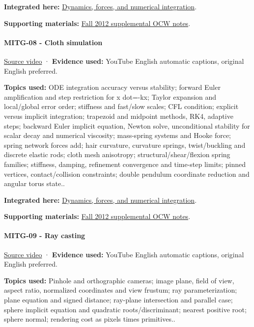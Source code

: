 \textbf{Integrated here:} \hyperref[04-visual-computing-ii-ch029]{Dynamics, forces, and numerical integration}.

\textbf{Supporting materials:} \href{https://ocw.mit.edu/courses/6-837-computer-graphics-fall-2012/pages/lecture-notes/}{Fall 2012 supplemental OCW notes}.

\paragraph{MITG-08 - Cloth simulation}\label{mitg-08---cloth-simulation}

\href{https://www.youtube.com/watch?v=PJ8VzufNZ8o}{Source video} · \textbf{Evidence used:} YouTube English automatic captions, original English preferred.

\textbf{Topics used:} ODE integration accuracy versus stability; forward Euler amplification and step restriction for x dot=-kx; Taylor expansion and local/global error order; stiffness and fast/slow scales; CFL condition; explicit versus implicit integration; trapezoid and midpoint methods, RK4, adaptive steps; backward Euler implicit equation, Newton solve, unconditional stability for scalar decay and numerical viscosity; mass-spring systems and Hooke force; spring network forces add; hair curvature, curvature springs, twist/buckling and discrete elastic rods; cloth mesh anisotropy; structural/shear/flexion spring families; stiffness, damping, refinement convergence and time-step limits; pinned vertices, contact/collision constraints; double pendulum coordinate reduction and angular torus state..

\textbf{Integrated here:} \hyperref[04-visual-computing-ii-ch029]{Dynamics, forces, and numerical integration}.

\textbf{Supporting materials:} \href{https://ocw.mit.edu/courses/6-837-computer-graphics-fall-2012/pages/lecture-notes/}{Fall 2012 supplemental OCW notes}.

\paragraph{MITG-09 - Ray casting}\label{mitg-09---ray-casting}

\href{https://www.youtube.com/watch?v=mJHGcDc37kY}{Source video} · \textbf{Evidence used:} YouTube English automatic captions, original English preferred.

\textbf{Topics used:} Pinhole and orthographic cameras; image plane, field of view, aspect ratio, normalized coordinates and view frustum; ray parameterization; plane equation and signed distance; ray-plane intersection and parallel case; sphere implicit equation and quadratic roots/discriminant; nearest positive root; sphere normal; rendering cost as pixels times primitives..

